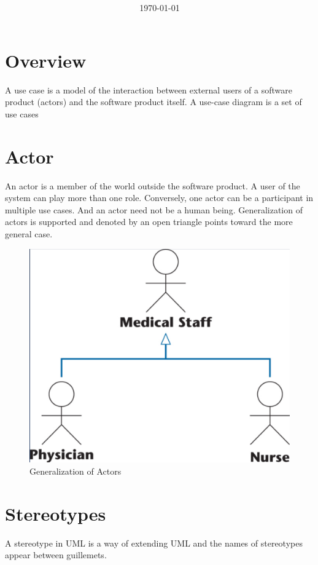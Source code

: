 \documentclass[11pt]{article}
\title{\textbf{\Topic}}
\author{\Name}
\date{\today}
\begin{document}
\maketitle
\noindent\makebox[\linewidth]{\rule[8pt]{5in}{0.5pt}}


\section*{Overview}
A use case is a model of the interaction between external users of a software product (actors) and the software product itself. A use-case diagram is a set of use cases

\section*{Actor}

An actor is a member of the world outside the software product. A user of the system can play more than one role. Conversely, one actor can be a participant in multiple use cases. And an actor need not be a human being. Generalization of actors is supported and denoted by an open triangle points toward the more general case.

\begin{figure}[h]
	\centering
	\includegraphics[width=0.4\linewidth]{images/GeneralizationActor.png}
	\caption{Generalization of Actors}
	\label{fig:GeneralizationActor}
\end{figure}

\section*{Stereotypes}
 
A stereotype in UML is a way of extending UML and the names of stereotypes appear between guillemets.
\end{document}
